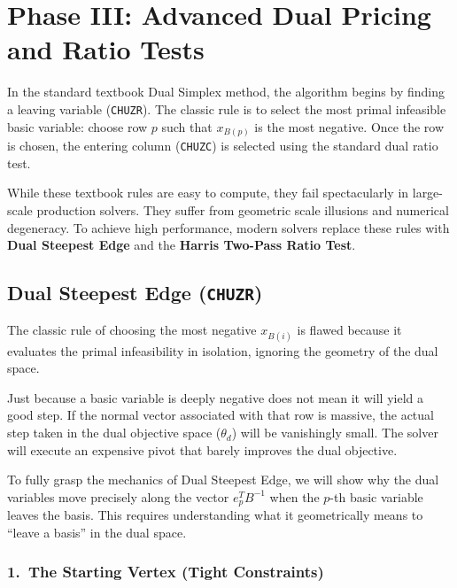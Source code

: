 \documentclass[11pt, a4paper]{article}
\begin{document}
\section{Phase III: Advanced Dual Pricing and Ratio Tests}

In the standard textbook Dual Simplex method, the algorithm begins by finding a leaving variable (\texttt{CHUZR}). The classic rule is to select the most primal infeasible basic variable: choose row $p$ such that $x_{B(p)}$ is the most negative. Once the row is chosen, the entering column (\texttt{CHUZC}) is selected using the standard dual ratio test.

While these textbook rules are easy to compute, they fail spectacularly in large-scale production solvers. They suffer from geometric scale illusions and numerical degeneracy. To achieve high performance, modern solvers replace these rules with \textbf{Dual Steepest Edge} and the \textbf{Harris Two-Pass Ratio Test}.

\subsection{Dual Steepest Edge (\texttt{CHUZR})}

The classic rule of choosing the most negative $x_{B(i)}$ is flawed because it evaluates the primal infeasibility in isolation, ignoring the geometry of the dual space.

\begin{warning}
Just because a basic variable is deeply negative does not mean it will yield a good step. If the normal vector associated with that row is massive, the actual step taken in the dual objective space ($\theta_d$) will be vanishingly small. The solver will execute an expensive pivot that barely improves the dual objective.
\end{warning}

To fully grasp the mechanics of Dual Steepest Edge, we will show why the dual variables move precisely along the vector $e_p^T B^{-1}$ when the $p$-th basic variable leaves the basis. This requires understanding what it geometrically means to ``leave a basis'' in the dual space.

\subsubsection*{1.\ The Starting Vertex (Tight Constraints)}
\end{document}
